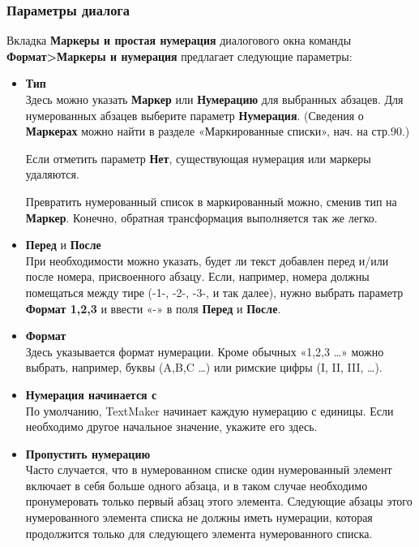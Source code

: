 \documentclass[a4paper,10pt]{article}
\begin{document}
\subsubsection{Параметры диалога}
Вкладка \textbf{Маркеры и простая нумерация} диалогового окна команды \textbf{Формат>Маркеры и нумерация} предлагает следующие параметры:
\begin{itemize}
 \item \textbf{Тип}\\
 Здесь можно указать \textbf{Маркер} или \textbf{Нумерацию} для выбранных абзацев. Для нумерованных абзацев выберите параметр \textbf{Нумерация}. (Сведения о \textbf{Маркерах} можно найти в разделе «Маркированные списки», нач. на стр.90.)
 
 Если отметить параметр \textbf{Нет}, существующая нумерация или маркеры удаляются.
 
 Превратить нумерованный список в маркированный можно, сменив тип на \textbf{Маркер}. Конечно, обратная трансформация выполняется так же легко.
 \item \textbf{Перед} и \textbf{После}\\
 При необходимости можно указать, будет ли текст добавлен перед и/или после номера, присвоенного абзацу. Если, например, номера должны помещаться между тире (-1-, -2-, -3-, и так далее), нужно выбрать параметр \textbf{Формат 1,2,3} и ввести «-» в поля \textbf{Перед} и \textbf{После}.
 \item \textbf{Формат}\\
 Здесь указывается формат нумерации. Кроме обычных «1,2,3 …» можно выбрать, например, буквы (A,B,C …) или римские цифры (I, II, III, …).
 \item \textbf{Нумерация начинается с}\\
 По умолчанию, TextMaker начинает каждую нумерацию с единицы. Если необходимо другое начальное значение, укажите его здесь.
 \item \textbf{Пропустить нумерацию}\\
 Часто случается, что в нумерованном списке один нумерованный элемент включает в себя больше одного абзаца, и в таком случае необходимо пронумеровать только первый абзац этого элемента. Следующие абзацы этого нумерованного элемента списка не должны иметь нумерации, которая продолжится только для следующего элемента нумерованного списка.
 

\end{itemize}
\end{document}
